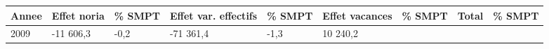 \begin{longtable}[]{@{}lllllllll@{}}
\toprule
\begin{minipage}[b]{0.05\columnwidth}\raggedright
Annee\strut
\end{minipage} & \begin{minipage}[b]{0.10\columnwidth}\raggedright
Effet noria\strut
\end{minipage} & \begin{minipage}[b]{0.06\columnwidth}\raggedright
\% SMPT\strut
\end{minipage} & \begin{minipage}[b]{0.16\columnwidth}\raggedright
Effet var. effectifs\strut
\end{minipage} & \begin{minipage}[b]{0.06\columnwidth}\raggedright
\% SMPT\strut
\end{minipage} & \begin{minipage}[b]{0.12\columnwidth}\raggedright
Effet vacances\strut
\end{minipage} & \begin{minipage}[b]{0.06\columnwidth}\raggedright
\% SMPT\strut
\end{minipage} & \begin{minipage}[b]{0.09\columnwidth}\raggedright
Total\strut
\end{minipage} & \begin{minipage}[b]{0.06\columnwidth}\raggedright
\% SMPT\strut
\end{minipage}\tabularnewline
\midrule
\endhead
\begin{minipage}[t]{0.05\columnwidth}\raggedright
2009\strut
\end{minipage} & \begin{minipage}[t]{0.10\columnwidth}\raggedright
-11 606,3\strut
\end{minipage} & \begin{minipage}[t]{0.06\columnwidth}\raggedright
-0,2\strut
\end{minipage} & \begin{minipage}[t]{0.16\columnwidth}\raggedright
-71 361,4\strut
\end{minipage} & \begin{minipage}[t]{0.06\columnwidth}\raggedright
-1,3\strut
\end{minipage} & \begin{minipage}[t]{0.12\columnwidth}\raggedright
10 240,2\strut
\end{minipage} & \begin{minipage}[t]{0.06\columnwidth}\raggedright

\end{minipage}
\end{longtable}
